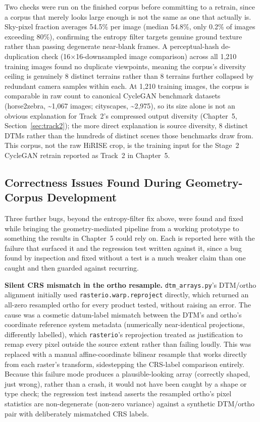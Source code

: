 Two checks were run on the finished corpus before committing to a retrain, since a corpus that merely looks large enough is not the same as one that actually is. Sky-pixel fraction averages 54.5\% per image (median 54.8\%, only 0.2\% of images exceeding 80\%), confirming the entropy filter targets genuine ground texture rather than passing degenerate near-blank frames. A perceptual-hash de-duplication check (16$\times$16-downsampled image comparison) across all 1{,}210 training images found no duplicate viewpoints, meaning the corpus's diversity ceiling is genuinely 8 distinct terrains rather than 8 terrains further collapsed by redundant camera samples within each. At 1{,}210 training images, the corpus is comparable in raw count to canonical CycleGAN benchmark datasets (horse2zebra, \textasciitilde1{,}067 images; cityscapes, \textasciitilde2{,}975), so its size alone is not an obvious explanation for Track~2's compressed output diversity (Chapter~5, Section~\ref{sec:track2}); the more direct explanation is source diversity, 8 distinct DTMs rather than the hundreds of distinct scenes those benchmarks draw from. This corpus, not the raw HiRISE crop, is the training input for the Stage~2 CycleGAN retrain reported as Track~2 in Chapter~5.

\subsection{Correctness Issues Found During Geometry-Corpus Development}
\label{sec:geometry-bugs}

Three further bugs, beyond the entropy-filter fix above, were found and fixed while bringing the geometry-mediated pipeline from a working prototype to something the results in Chapter~5 could rely on. Each is reported here with the failure that surfaced it and the regression test written against it, since a bug found by inspection and fixed without a test is a much weaker claim than one caught and then guarded against recurring.

\textbf{Silent CRS mismatch in the ortho resample.} \texttt{dtm\_arrays.py}'s DTM/ortho alignment initially used \texttt{rasterio.warp.reproject} directly, which returned an all-zero resampled ortho for every product tested, without raising an error. The cause was a cosmetic datum-label mismatch between the DTM's and ortho's coordinate reference system metadata (numerically near-identical projections, differently labelled), which \texttt{rasterio}'s reprojection treated as justification to remap every pixel outside the source extent rather than failing loudly. This was replaced with a manual affine-coordinate bilinear resample that works directly from each raster's transform, sidestepping the CRS-label comparison entirely. Because this failure mode produces a plausible-looking array (correctly shaped, just wrong), rather than a crash, it would not have been caught by a shape or type check; the regression test instead asserts the resampled ortho's pixel statistics are non-degenerate (non-zero variance) against a synthetic DTM/ortho pair with deliberately mismatched CRS labels.

